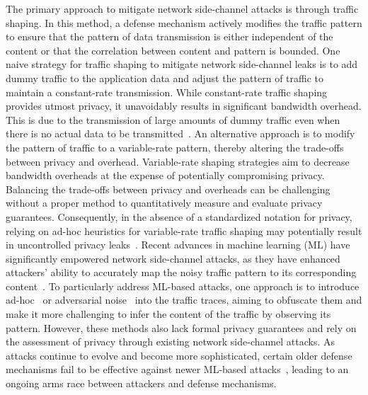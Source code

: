 The primary approach to mitigate network side-channel attacks is through traffic shaping. In this method, a defense mechanism actively modifies the traffic pattern to ensure that the pattern of data transmission is either independent of the content or that the correlation between content and pattern is bounded.  
One naive strategy for traffic shaping to mitigate network side-channel leaks is to add dummy traffic to the application data and adjust the pattern of traffic to maintain a constant-rate transmission.
While constant-rate traffic shaping provides utmost privacy, it unavoidably results in significant bandwidth overhead.
This is due to the transmission of large amounts of dummy traffic even when there is no actual data to be transmitted~\cite{saponas2007devices}.  
An alternative approach is to modify the pattern of traffic to a variable-rate pattern, thereby altering the trade-offs between privacy and overhead.
Variable-rate shaping strategies aim to decrease bandwidth overheads at the expense of potentially compromising privacy.
Balancing the trade-offs between privacy and overheads can be challenging without a proper method to quantitatively measure and evaluate privacy guarantees. 
Consequently, in the absence of a standardized notation for privacy, relying on ad-hoc heuristics for variable-rate traffic shaping may potentially result in uncontrolled privacy leaks~\cite{gong2020zero, cai2014csbuflo, lu2018dynaflow, juarez2016wtfpad, cai2014tamaraw}.
Recent advances in machine learning (ML) have significantly empowered network side-channel attacks, as they have enhanced attackers' ability to accurately map the noisy traffic pattern to its corresponding content~\cite{schuster2017beautyburst, bhat2019varcnn, hayes2016kfp, sirinam2018df}.
To particularly address ML-based attacks, one approach is to introduce ad-hoc~\cite{luo2011httpos} or adversarial noise~\cite{shan2021dolos, nasr2021blind, rahman2020mockingbird} into the traffic traces, aiming to obfuscate them and make it more challenging to infer the content of the traffic by observing its pattern. 
However, these methods also lack formal privacy guarantees and rely on the assessment of privacy through existing network side-channel attacks.
As attacks continue to evolve and become more sophisticated, certain older defense mechanisms fail to be effective against newer ML-based attacks~\cite{sirinam2018df}, leading to an ongoing arms race between attackers and defense mechanisms.

